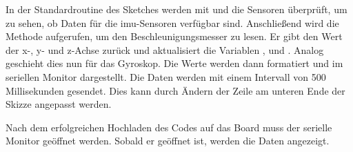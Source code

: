 In der Standardroutine  des Sketches werden mit  und  die Sensoren überprüft, um zu sehen, ob Daten für die \ac{imu}-Sensoren verfügbar sind. Anschließend wird die Methode  aufgerufen, um den Beschleunigungsmesser zu lesen. Er gibt den Wert der x-, y- und z-Achse zurück und aktualisiert die Variablen ,  und . Analog geschieht dies nun für das Gyroskop. Die Werte werden dann formatiert und  im seriellen Monitor dargestellt. Die Daten werden mit einem Intervall von 500 Millisekunden gesendet. Dies kann durch Ändern der Zeile  am unteren Ende der Skizze angepasst werden.


Nach dem erfolgreichen Hochladen des Codes auf das Board muss der serielle Monitor geöffnet werden.  Sobald er geöffnet ist, werden die Daten angezeigt.


\begin{code}
    {\scriptsize
        
    }
    \caption{Sketch zur Verwendung der IMU}\label{IMUSketch}
\end{code}




